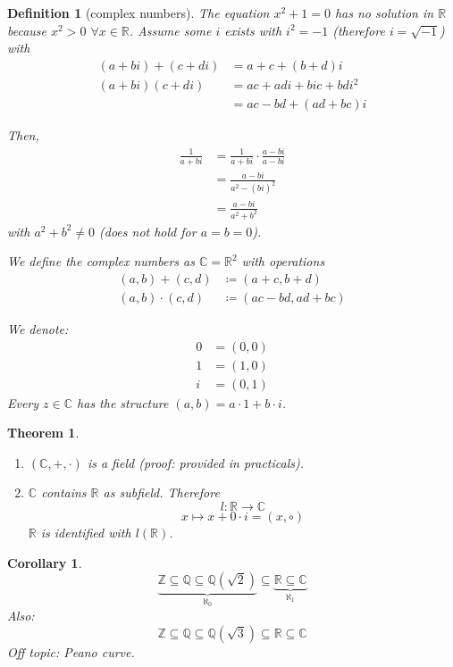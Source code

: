 \documentclass[a4paper,landscape,twocolumn]{article}
\newtheorem{theorem}{Theorem}
\newtheorem{defi}{Definition}
\newtheorem{cor}{Corollary}
\begin{document}
\begin{defi}[complex numbers]
  The equation $x^2 + 1 = 0$ has no solution in $\mathbb R$ because $x^2 > 0$
  $\forall x \in \mathbb R$. Assume some $i$ exists with $i^2 = -1$
  (therefore $i = \sqrt{-1}$) with
  \begin{align*}
    (a + bi) + (c + di) &= a + c + (b + d)i \\
    (a + bi) (c + di) &= ac + adi + bic + bdi^2 \\
      &= ac - bd + (ad + bc) i
  \end{align*}

  Then,
  \begin{align*}
    \frac{1}{a + bi} &= \frac{1}{a + bi} \cdot \frac{a - bi}{a - bi} \\
        &= \frac{a - bi}{a^2 - (bi)^2} \\
        &= \frac{a - bi}{a^2 + b^2}
  \end{align*}
  with $a^2 + b^2 \neq 0$ (does not hold for $a = b = 0$).

  We define the complex numbers as $\mathbb C = \mathbb R^2$
  with operations
  \begin{align*}
    (a, b) + (c, d) &\coloneqq (a + c, b + d) \\
    (a, b) \cdot (c, d) &\coloneqq (ac - bd, ad + bc)
  \end{align*}

  We denote:
  \begin{align*}
    0 &= (0, 0) \\
    1 &= (1, 0) \\
    i &= (0, 1)
  \end{align*}
  Every $z \in \mathbb C$ has the structure $(a, b) = a \cdot 1 + b \cdot i$.
\end{defi}

\begin{theorem}
  \begin{enumerate}
    \item $(\mathbb C, +, \cdot)$ is a field (proof: provided in practicals).
    \item $\mathbb C$ contains $\mathbb R$ as subfield. Therefore
      \[ l: \mathbb R \rightarrow \mathbb C \]
      \[ x \mapsto x + 0 \cdot i = (x, \circ) \]
      $\mathbb R$ is identified with $l(\mathbb R)$.
  \end{enumerate}
\end{theorem}

\begin{cor}
  \[
    \underbrace{\mathbb Z \subseteq \mathbb Q \subseteq \mathbb Q(\sqrt{2})}_{\aleph_0}
    \subseteq \underbrace{\mathbb R \subseteq \mathbb C}_{\aleph_1}
  \]
  Also:
  \[
    \mathbb Z \subseteq \mathbb Q \subseteq \mathbb Q(\sqrt{3})
    \subseteq \mathbb R \subseteq \mathbb C
  \]
  Off topic: Peano curve.
\end{cor}
\end{document}
